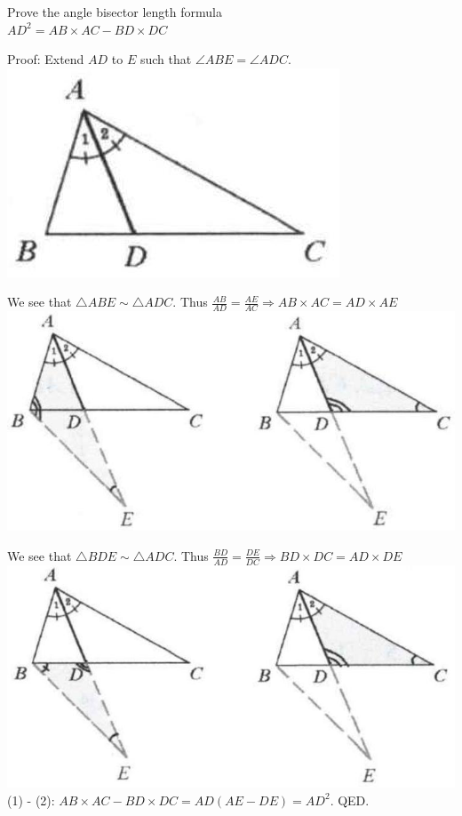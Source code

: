 \documentclass{article}
\begin{document}
Prove the angle bisector length formula\\
\(A D^{2}=A B \times A C-B D \times D C\)

Proof:
Extend \(A D\) to \(E\) such that \(\angle A B E=\angle A D C\).\\
\centering
\includegraphics[width=\textwidth]{images/062.jpg}

We see that \(\triangle A B E \sim \triangle A D C\). Thus \(\frac{A B}{A D}=\frac{A E}{A C} \Rightarrow A B \times A C=A D \times A E\)\\
\centering
\includegraphics[width=\textwidth]{images/063(1).jpg}

We see that \(\triangle B D E \sim \triangle A D C\). Thus \(\frac{B D}{A D}=\frac{D E}{D C} \Rightarrow B D \times D C=A D \times D E\)\\
\centering
\includegraphics[width=\textwidth]{images/063.jpg}\\
(1) - (2): \(A B \times A C-B D \times D C=A D(A E-D E)=A D^{2}\). QED.
\end{document}
